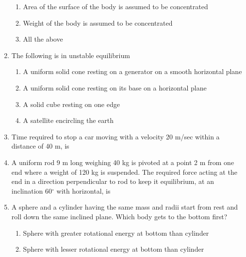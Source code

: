 \documentclass[11pt,a4paper]{article}
\begin{document}
\begin{enumerate}
\begin{enumerate}[label=\Alph*.]
\item{Area of the surface of the body is assumed to be concentrated}
\item{Weight of the body is assumed to be concentrated}
\item{All the above}
\end{enumerate}
\item{The following is in unstable equilibrium}
\begin{enumerate}[label=\Alph*.]
\item{A uniform solid cone resting on a generator on a smooth horizontal plane}
\item{A uniform solid cone resting on its base on a horizontal plane}
\item{A solid cube resting on one edge}
\item{A satellite encircling the earth}
\end{enumerate}
\item{Time required to stop a car moving with a velocity 20 m/sec within a distance of 40 m, is}
\\
\item{A uniform rod 9 m long weighing 40 kg is pivoted at a point 2 m from one end where a weight of 120 kg is suspended. The required force acting at the end in a direction perpendicular to rod to keep it equilibrium, at an inclination 60$^\circ$ with horizontal, is
}
\\
\item{A sphere and a cylinder having the same mass and radii start from rest and roll down the same inclined plane. Which body gets to the bottom first?}
\begin{enumerate}[label=\Alph*.]
\item{Sphere with greater rotational energy at bottom than cylinder}
\item{Sphere with lesser rotational energy at bottom than cylinder}

\end{enumerate}
\end{enumerate}
\end{document}
